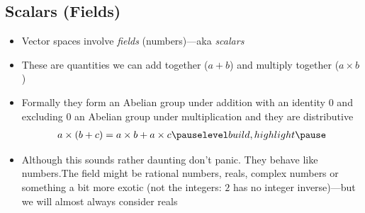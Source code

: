 
\begin{slide}
\section[-2]{Scalars (Fields)}

\begin{PauseHighLight}
  \begin{itemize}
  \item Vector spaces involve \emph{fields} (numbers)\pause---aka \emph{scalars}\pauseb
  \item These are quantities we can add together ($a+b$) and
    multiply together ($a\times b$)\pause
  \item Formally they form an Abelian group under addition with an identity $0$\pauseb{}
    and excluding $0$ an Abelian group under multiplication\pauseb{} and they are distributive
    \begin{align*}
      a\times (b + c) = a\times b + a\times c\pauseb
    \end{align*}
  \item Although this sounds rather daunting don't panic\pauseb.  They behave
    like numbers.\pauseb  The field might be rational numbers,
    reals, complex numbers or something a bit more exotic (not the
    integers: $2$ has no integer inverse)\pauseb---but
    we will almost always consider reals\pauseb
  \end{itemize}
\end{PauseHighLight}
  

\end{slide}



